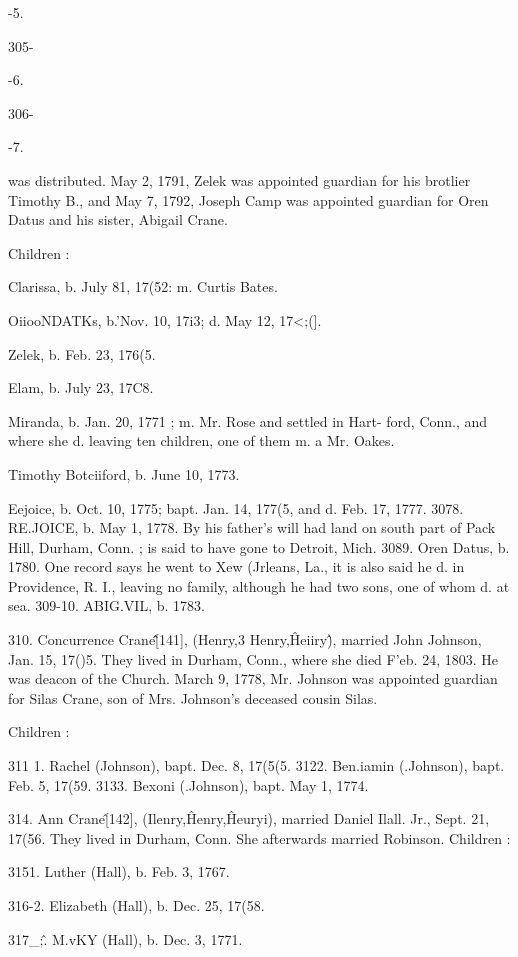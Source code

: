\documentclass{book}
\begin{document}
-5. 


305- 


-6. 


306- 


-7. 




was distributed. May 2, 1791, Zelek was appointed guardian 
for his brotlier Timothy B., and May 7, 1792, Joseph Camp was 
appointed guardian for Oren Datus and his sister, Abigail Crane. 

Children : 

Clarissa, b. July 81, 17(52: m. Curtis Bates. 

OiiooNDATKs, b.'Nov. 10, 17i3; d. May 12, 17<;(]. 

Zelek, b. Feb. 23, 176(5. 

Elam, b. July 23, 17C8. 

Miranda, b. Jan. 20, 1771 ; m. Mr. Rose and settled in Hart- 
ford, Conn., and where she d. leaving ten children, one of 
them m. a Mr. Oakes. 

Timothy Botciiford, b. June 10, 1773. 

Eejoice, b. Oct. 10, 1775; bapt. Jan. 14, 177(5, and d. Feb. 
17, 1777. 
3078. RE.JOICE, b. May 1, 1778. By his father's will had land on 
south part of Pack Hill, Durham, Conn. ; is said to have 
gone to Detroit, Mich. 
3089. Oren Datus, b. 1780. One record says he went to Xew 
(Jrleans, La., it is also said he d. in Providence, R. I., 
leaving no family, although he had two sons, one of whom 
d. at sea. 
309-10. ABIG.VIL, b. 1783. 

310. Concurrence Crane\^\^ [141], (Henry,3 Henry,\^ Heiiry\^), 
married John Johnson, Jan. 15, 17()5. They lived in Durham, 
Conn., where she died F'eb. 24, 1803. He was deacon of the 
Church. March 9, 1778, Mr. Johnson was appointed guardian 
for Silas Crane, son of Mrs. Johnson's deceased cousin Silas. 

Children : 

311  1. Rachel (Johnson), bapt. Dec. 8, 17(5(5. 
3122. Ben.iamin (.Johnson), bapt. Feb. 5, 17(59. 
3133. Bexoni (.Johnson), bapt. May 1, 1774. 

314. Ann Crane\^ [142], (Ilenry,\^ Henry,\^ Heuryi), married 
Daniel Ilall. Jr., Sept. 21, 17(56. They lived in Durham, Conn. 
She afterwards married Robinson. Children : 

3151. Luther (Hall), b. Feb. 3, 1767. 

316-2. Elizabeth (Hall), b. Dec. 25, 17(58. 

317\_;\^. M.vKY (Hall), b. Dec. 3, 1771. 
\end{document}
